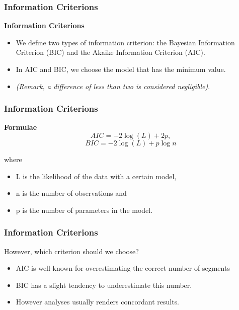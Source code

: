 \documentclass[PredictiveAnalytics101.tex]{subfiles}
\begin{document}
	\begin{frame}
		\frametitle{Information Criterions}
		\Large
		\textbf{Information Criterions}
		\begin{itemize}
		\item We define two types of information criterion: the Bayesian Information
		Criterion (BIC) and the Akaike Information Criterion (AIC). 
		\item In AIC and BIC, we choose the model that
		has the minimum value.
				\item \textit{ (Remark, a difference of less than two is considered negligible)}.
		\end{itemize}
\end{frame}
	\begin{frame}
		\frametitle{Information Criterions}
		\textbf{Formulae}
		\Large	
			\[AIC = −2\log (L)+2p,\]
		\[BIC = −2\log (L)+p\log n\]
		
		where
		\begin{itemize}
			\item L is the likelihood of the data with a certain model,
			\item n is the number of observations and
			\item p is the number of parameters in the model.
		\end{itemize}
	\end{frame}
\begin{frame}
\frametitle{Information Criterions}
	
			\Large	
	However, which criterion should we choose?
	\begin{itemize}
		\item AIC is well-known for
		overestimating the correct number of segments
		\item BIC has a slight tendency
		to underestimate this number.
		\item However analyses usually renders concordant results.
	\end{itemize}
	
\end{frame}
\end{document}
